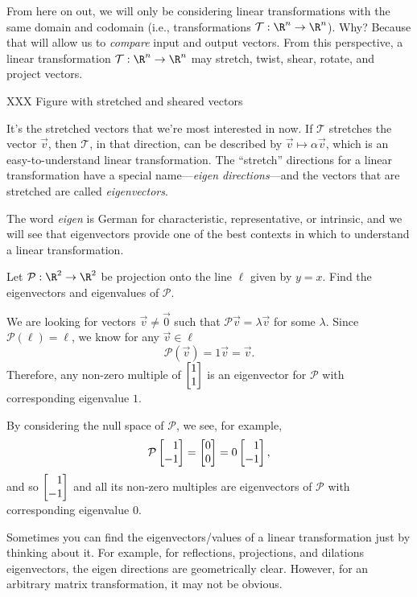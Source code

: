 From here on out, we will only be considering linear transformations with the same domain
and codomain (i.e., transformations $\mathcal T:\R^n\to\R^n$). Why? Because that will allow us
to \emph{compare} input and output vectors. From this perspective, a linear transformation $\mathcal T:\R^n\to\R^n$
may stretch, twist, shear, rotate, and project vectors. 

XXX Figure with stretched and sheared vectors

It's the stretched vectors that we're most interested in now. If $\mathcal T$ stretches the vector $\vec v$,
then $\mathcal T$, in that direction, can be described by $\vec v\mapsto \alpha\vec v$, which is an easy-to-understand
linear transformation. The ``stretch'' directions for a linear transformation have a special name---\emph{eigen directions}---and
the vectors that are stretched are called \emph{eigenvectors}.


The word \emph{eigen} is German for characteristic, representative, or intrinsic, and
we will see that eigenvectors provide one of the best contexts in which to understand a linear transformation.

\begin{example}
	Let $\mathcal P:\R^2\to\R^2$ be projection onto the line $\ell$ given by $y=x$.
	Find the eigenvectors and eigenvalues of $\mathcal P$.

	We are looking for vectors $\vec v\neq \vec 0$ such that $\mathcal P\vec v=\lambda \vec v$ for some $\lambda$.
	Since $\mathcal P(\ell)=\ell$, we know for any $\vec v\in \ell$
	\[
		\mathcal P(\vec v)=1\vec v=\vec v.
	\]
	Therefore, any non-zero multiple of $\mat{1\\1}$ is an eigenvector for $\mathcal P$ with corresponding
	eigenvalue $1$.

	By considering the null space of $\mathcal P$, we see, for example,
	\[
		\mathcal P\mat{1\\-1}=\mat{0\\0}=0\mat{1\\-1},
	\]
	and so $\mat{1\\-1}$ and all its non-zero multiples are eigenvectors of $\mathcal P$ with corresponding
	eigenvalue $0$.
\end{example}


Sometimes you can find the eigenvectors/values of a linear transformation just by thinking about it.
For example, for reflections, projections, and dilations eigenvectors, the eigen directions
are geometrically clear. However, for an arbitrary matrix transformation, it may not be obvious.

